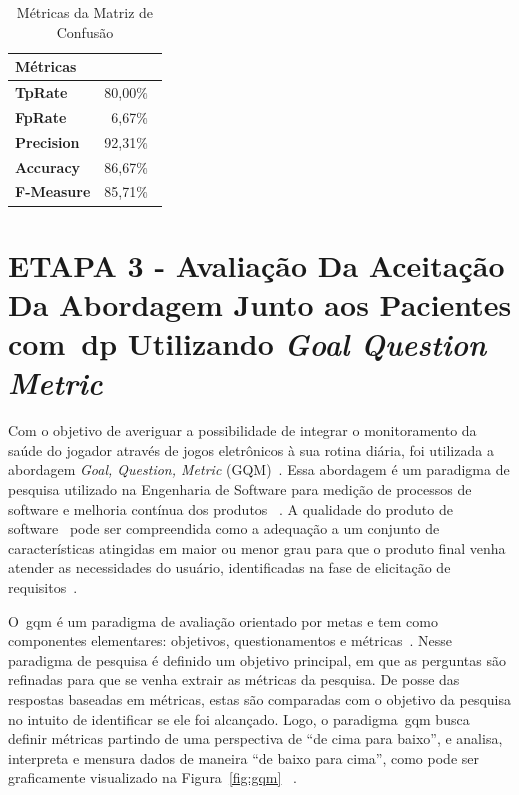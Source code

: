\begin{table}[!htbp]
\label{table:metricasmatrizconfusao}
\caption{Métricas da Matriz de Confusão}
\centering
\begin{tabular}{|l|r|}





\hline
\multicolumn{2}{|l|}{\textbf{Métricas}} \\ \hline
\textbf{TpRate}                    & 80,00$\%$\                 \\ \hline
\textbf{FpRate}                    & 6,67$\%$\                \\ \hline
\textbf{Precision}                 & 92,31$\%$\                \\ \hline
\textbf{Accuracy}                  & 86,67$\%$\                \\ \hline
\textbf{F-Measure}                 & 85,71$\%$\                \\ \hline
\end{tabular}
\end{table}








\section{ETAPA 3 - Avaliação Da Aceitação Da Abordagem Junto aos Pacientes com~\ac{dp} Utilizando \textit{Goal Question Metric}}\label{gqm_usuarios}


Com o objetivo de averiguar a possibilidade de integrar o monitoramento da saúde do jogador através de jogos eletrônicos à sua rotina diária, foi utilizada a abordagem \textit{Goal, Question, Metric} (GQM)~\cite{van1999goal}. Essa abordagem é um paradigma de pesquisa utilizado na Engenharia de Software para medição de processos de software e melhoria contínua dos produtos ~\cite{saraiva2006,elicquest05}. A qualidade do produto de software~\cite{saraiva2006} pode ser compreendida como a adequação a um conjunto de características atingidas em maior ou menor grau para que o produto final venha atender as necessidades do usuário, identificadas na fase de elicitação de requisitos~\cite{elicquest05}.

O~\ac{gqm} é um paradigma de avaliação orientado por metas e tem como componentes elementares: objetivos, questionamentos e métricas~\cite{saraiva2006}. Nesse paradigma de pesquisa é definido um objetivo principal, em que as perguntas são refinadas para que se venha extrair as métricas da pesquisa. De posse das respostas baseadas em métricas, estas são comparadas com o objetivo da pesquisa no intuito de identificar se ele foi alcançado. Logo, o paradigma~\ac{gqm} busca definir métricas partindo de uma perspectiva de ``de cima para baixo'', e analisa, interpreta e mensura dados de maneira ``de baixo para cima'', como pode ser graficamente visualizado na Figura~\ref{fig:gqm} ~\cite{van1999goal}. 

